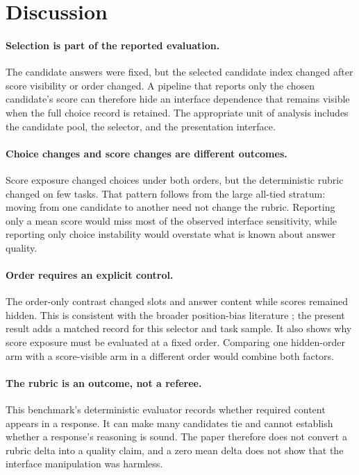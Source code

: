 \documentclass[11pt]{article}
\begin{document}
\section{Discussion}

\paragraph{Selection is part of the reported evaluation.}
The candidate answers were fixed, but the selected candidate index changed after score visibility or
order changed. A pipeline that reports only the chosen candidate's score can therefore hide an
interface dependence that remains visible when the full choice record is retained. The appropriate
unit of analysis includes the candidate pool, the selector, and the presentation interface.

\paragraph{Choice changes and score changes are different outcomes.}
Score exposure changed choices under both orders, but the deterministic rubric changed on few tasks.
That pattern follows from the large all-tied stratum: moving from one candidate to another need not
change the rubric. Reporting only a mean score would miss most of the observed interface sensitivity,
while reporting only choice instability would overstate what is known about answer quality.

\paragraph{Order requires an explicit control.}
The order-only contrast changed slots and answer content while scores remained hidden. This is
consistent with the broader position-bias literature \citep{shi2024judgingjudges}; the present result
adds a matched record for this selector and task sample. It also shows why score exposure must be
evaluated at a fixed order. Comparing one hidden-order arm with a score-visible arm in a different
order would combine both factors.

\paragraph{The rubric is an outcome, not a referee.}
This benchmark's deterministic evaluator records whether required content appears in a response.
It can make many candidates tie and cannot establish whether a response's reasoning is sound. The
paper therefore does not convert a rubric delta into a quality claim, and a zero mean delta does not
show that the interface manipulation was harmless.
\end{document}
